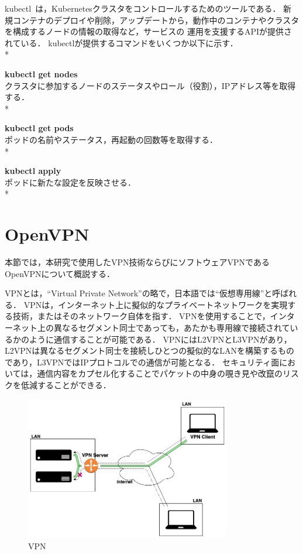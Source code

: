 kubectl~\cite{kubectl}は，Kubernetesクラスタをコントロールするためのツールである．
新規コンテナのデプロイや削除，アップデートから，動作中のコンテナやクラスタを構成するノードの情報の取得など，サービスの
運用を支援するAPIが提供されている．
kubectlが提供するコマンドをいくつか以下に示す．\\*

{\bf kubectl get nodes}\\
クラスタに参加するノードのステータスやロール（役割），IPアドレス等を取得する．\\*

{\bf kubectl get pods}\\
ポッドの名前やステータス，再起動の回数等を取得する．\\*

{\bf kubectl apply}\\
ポッドに新たな設定を反映させる．\\*

\section{OpenVPN}
\label{background:openvpn}

本節では，本研究で使用したVPN技術ならびにソフトウェアVPNであるOpenVPNについて概説する．

VPNとは，``Virtual Private Network''の略で，日本語では``仮想専用線''と呼ばれる．
VPNは，インターネット上に擬似的なプライベートネットワークを実現する技術，またはそのネットワーク自体を指す．
VPNを使用することで，インターネット上の異なるセグメント同士であっても，あたかも専用線で接続されているかのように通信することが可能である．
VPNにはL2VPNとL3VPNがあり，L2VPNは異なるセグメント同士を接続しひとつの擬似的なLANを構築するものであり，L3VPNではIPプロトコルでの通信が可能となる．
セキュリティ面においては，通信内容をカプセル化することでパケットの中身の覗き見や改竄のリスクを低減することができる．

\begin{figure}[htbp]
\begin{center}
    \includegraphics[width=0.8\textwidth]{./figures/openvpn.jpg}
    \caption{VPN}
\end{center}
\end{figure}

